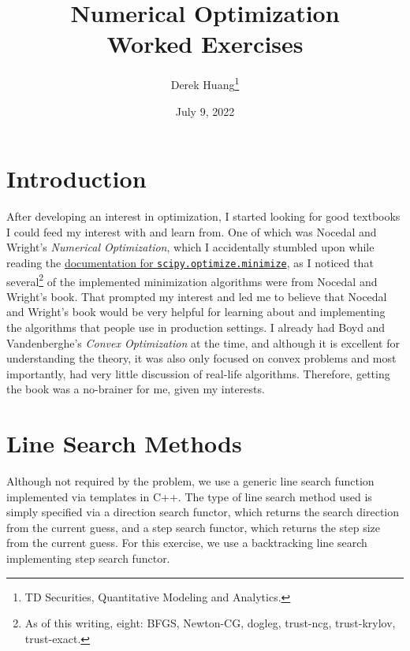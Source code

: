 \documentclass{article}
\title{Numerical Optimization \\ \Large Worked Exercises}
\author{%
    Derek Huang\thanks{TD Securities, Quantitative Modeling and Analytics.}
}
\date{July 9, 2022}
\begin{document}


\maketitle


\tableofcontents

\newpage

\section{Introduction}

After developing an interest in optimization, I started looking for good
textbooks I could feed my interest with and learn from. One of which was
Nocedal and Wright's \textit{Numerical Optimization}, which I accidentally
stumbled upon while reading the
\href{%
    https://docs.scipy.org/doc/scipy/reference/generated/%
    scipy.optimize.minimize.html%
}{documentation for \texttt{scipy.optimize.minimize}}, as I noticed that
several\footnote{%
    As of this writing, eight: BFGS, Newton-CG, dogleg, trust-ncg,
    trust-krylov, trust-exact.%
}
of the implemented minimization algorithms were from Nocedal and Wright's
book. That prompted my interest and led me to believe that Nocedal and
Wright's book would be very helpful for learning about and implementing the
algorithms that people use in production settings. I already had Boyd and
Vandenberghe's \textit{Convex Optimization} at the time, and although it is
excellent for understanding the theory, it was also only focused on convex
problems and most importantly, had very little discussion of real-life
algorithms. Therefore, getting the book was a no-brainer for me, given my
interests.

\medskip



\section{Line Search Methods}


Although not required by the problem, we use a generic line search function
implemented via templates in C++. The type of line search method used is
simply specified via a direction search functor, which returns the search
direction from the current guess, and a step search functor, which returns the
step size from the current guess. For this exercise, we use a backtracking
line search implementing step search functor.
\end{document}
